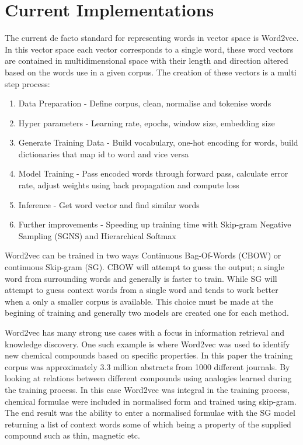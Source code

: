 \section{Current Implementations}
The current de facto standard for representing words in vector space is Word2vec. In this vector space each vector corresponds to a single word, these word vectors are contained in multidimensional space with their length and direction altered based on the words use in a given corpus. The creation of these vectors is a multi step process:
\begin{enumerate}
    \item Data Preparation - Define corpus, clean, normalise and tokenise words
    \item Hyper parameters - Learning rate, epochs, window size, embedding size
    \item Generate Training Data - Build vocabulary, one-hot encoding for words, build dictionaries that map id to word and vice versa
    \item Model Training - Pass encoded words through forward pass, calculate error rate, adjust weights using back propagation and compute loss
    \item Inference - Get word vector and find similar words
    \item Further improvements - Speeding up training time with Skip-gram Negative Sampling (SGNS) and Hierarchical Softmax
\end{enumerate}

\noindent
Word2vec can be trained in two ways Continuous Bag-Of-Words (CBOW) or continuous Skip-gram (SG). CBOW will attempt to guess the output; a single word from surrounding words and generally is faster to train. While SG will attempt to guess context words from a single word and tends to work better when a only a smaller corpus is available. This choice must be made at the begining of training and generally two models are created one for each method. \cite{Mikolov}

Word2vec has many strong use cases with a focus in information retrieval and knowledge discovery. One such example is where Word2vec was used to identify new chemical compounds based on specific properties. In this paper the training corpus was approximately 3.3 million abstracts from 1000 different journals. By looking at relations between different compounds using analogies learned during the training process. In this case Word2vec was integral in the training process, chemical formulae were included in normalised form and trained using skip-gram. The end result was the ability to enter a normalised formulae with the SG model returning a list of context words some of which being a property of the supplied compound such as thin, magnetic etc. \cite{Tshitoyan}

